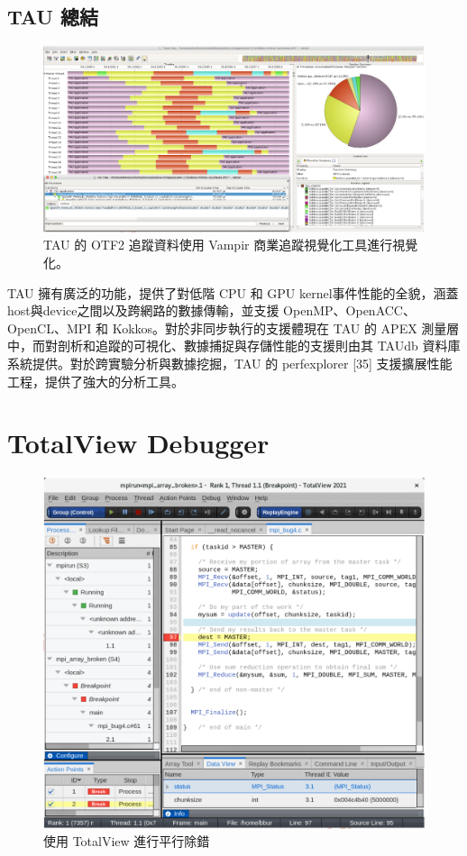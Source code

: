 \subsection{TAU 總結}

\begin{figure}
    \centering
    \includegraphics[width=0.9\linewidth]{FileAusiliari/Screenshots/Figure13-22.png}
    \caption{TAU 的 OTF2 追蹤資料使用 Vampir 商業追蹤視覺化工具進行視覺化。}
    \label{fig:PAPI22}
\end{figure}

TAU 擁有廣泛的功能，提供了對低階 CPU 和 GPU kernel事件性能的全貌，涵蓋host與device之間以及跨網路的數據傳輸，並支援 OpenMP、OpenACC、OpenCL、MPI 和 Kokkos。對於非同步執行的支援體現在 TAU 的 APEX 測量層中，而對剖析和追蹤的可視化、數據捕捉與存儲性能的支援則由其 TAUdb 資料庫系統提供。對於跨實驗分析與數據挖掘，TAU 的 perfexplorer [35] 支援擴展性能工程，提供了強大的分析工具。

\section{TotalView Debugger}


\begin{figure}
    \centering
    \includegraphics[width=0.9\linewidth]{FileAusiliari/Screenshots/Figure13-23.png}
    \caption{使用 TotalView 進行平行除錯}
    \label{fig:PAPI23}
\end{figure}


